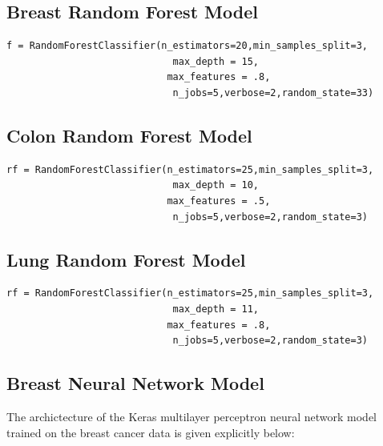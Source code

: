 \documentclass[a4paper,11pt]{article}
\begin{document}
\subsection{Breast Random Forest Model}
\label{subsec:breastrf}

\begin{verbatim}
f = RandomForestClassifier(n_estimators=20,min_samples_split=3,
                             max_depth = 15,
                            max_features = .8,
                             n_jobs=5,verbose=2,random_state=33)
\end{verbatim}


\subsection{Colon Random Forest Model}
\label{subsec:colonrf}


\begin{verbatim}
rf = RandomForestClassifier(n_estimators=25,min_samples_split=3,
                             max_depth = 10,
                            max_features = .5,
                             n_jobs=5,verbose=2,random_state=3)
\end{verbatim}




\subsection{Lung Random Forest Model}
\label{subsec:lungrf}



\begin{verbatim}
rf = RandomForestClassifier(n_estimators=25,min_samples_split=3,
                             max_depth = 11,
                            max_features = .8,
                             n_jobs=5,verbose=2,random_state=3)
\end{verbatim}



\subsection{Breast Neural Network Model}
\label{subsec:breastnn}

The archictecture of the Keras multilayer perceptron neural network model 
trained on the breast cancer data is given explicitly below:
\end{document}
